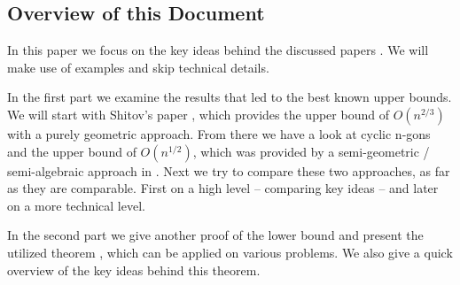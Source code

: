 \subsection{Overview of this Document}

In this paper we focus on the key ideas behind the discussed papers \cite{shitov2020sublinear,kwan2020extension}. We will make use of examples and skip technical details.

In the first part we examine the results that led to the best known upper bounds. 
We will start with Shitov's paper \cite{shitov2020sublinear}, which provides the upper bound of $O(n^{2/3})$ with a purely geometric approach.
From there we have a look at cyclic n-gons and the upper bound of $O(n^{1/2})$, which was provided by a semi-geometric / semi-algebraic approach in \cite{kwan2020extension}.
Next we try to compare these two approaches, as far as they are comparable. First on a high level -- comparing key ideas -- and later on a more technical level.

In the second part we give another proof of the lower bound and present the utilized theorem \cite[Theorem 1]{averkov2016maximum}, which can be applied on various problems. We also give a quick overview of the key ideas behind this theorem.
